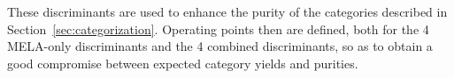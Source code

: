 These discriminants are used to enhance the purity of the categories described in Section~\ref{sec:categorization}. Operating points then are defined, both for the 4 MELA-only discriminants and the 4 combined discriminants, so as to obtain a good compromise between expected category yields and purities. %














